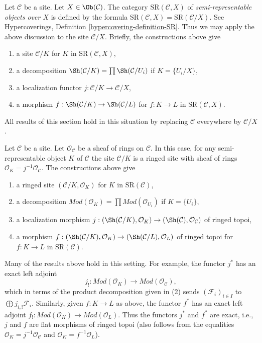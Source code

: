 \begin{remark}
\label{remark-semi-representable-over-object}
Let $\mathcal{C}$ be a site. Let $X \in \Ob(\mathcal{C})$.
The category $\text{SR}(\mathcal{C}, X)$
of {\it semi-representable objects over $X$}
is defined by the formula
$\text{SR}(\mathcal{C}, X) = \text{SR}(\mathcal{C}/X)$.
See Hypercoverings, Definition \ref{hypercovering-definition-SR}.
Thus we may apply the above discussion to the site
$\mathcal{C}/X$. Briefly, the constructions above give
\begin{enumerate}
\item a site $\mathcal{C}/K$ for $K$ in $\text{SR}(\mathcal{C}, X)$,
\item a decomposition
$\Sh(\mathcal{C}/K) = \prod \Sh(\mathcal{C}/U_i)$ if $K = \{U_i/X\}$,
\item a localization functor $j : \mathcal{C}/K \to \mathcal{C}/X$,
\item a morphism $f : \Sh(\mathcal{C}/K) \to \Sh(\mathcal{C}/L)$
for $f : K \to L$ in $\text{SR}(\mathcal{C}, X)$.
\end{enumerate}
All results of this section hold in this situation by replacing
$\mathcal{C}$ everywhere by $\mathcal{C}/X$.
\end{remark}

\begin{remark}
\label{remark-semi-representable-ringed}
Let $\mathcal{C}$ be a site. Let $\mathcal{O}_\mathcal{C}$
be a sheaf of rings on $\mathcal{C}$. In this case, for any
semi-representable object $K$ of $\mathcal{C}$ the site
$\mathcal{C}/K$ is a ringed site with sheaf
of rings $\mathcal{O}_K = j^{-1}\mathcal{O}_\mathcal{C}$.
The constructions above give
\begin{enumerate}
\item a ringed site $(\mathcal{C}/K, \mathcal{O}_K)$
for $K$ in $\text{SR}(\mathcal{C})$,
\item a decomposition
$\textit{Mod}(\mathcal{O}_K) =
\prod \textit{Mod}(\mathcal{O}_{U_i})$ if $K = \{U_i\}$,
\item a localization morphism
$j : (\Sh(\mathcal{C}/K), \mathcal{O}_K) \to
(\Sh(\mathcal{C}), \mathcal{O}_\mathcal{C})$
of ringed topoi,
\item a morphism
$f : (\Sh(\mathcal{C}/K), \mathcal{O}_K) \to
(\Sh(\mathcal{C}/L), \mathcal{O}_L)$ of ringed topoi
for $f : K \to L$ in $\text{SR}(\mathcal{C})$.
\end{enumerate}
Many of the results above hold in this setting. For example, the
functor $j^*$ has an exact left adjoint
$$
j_! : \textit{Mod}(\mathcal{O}_K) \to \textit{Mod}(\mathcal{O}_\mathcal{C}),
$$
which in terms of the product decomposition given in (2) sends
$(\mathcal{F}_i)_{i \in I}$ to $\bigoplus j_{i, !}\mathcal{F}_i$.
Similarly, given $f : K \to L$ as above, the functor $f^*$ has
an exact left adjoint
$f_! : \textit{Mod}(\mathcal{O}_K) \to \textit{Mod}(\mathcal{O}_L)$.
Thus the functors $j^*$ and $f^*$ are exact, i.e.,
$j$ and $f$ are flat morphisms of ringed topoi (also follows
from the equalities $\mathcal{O}_K = j^{-1}\mathcal{O}_\mathcal{C}$
and $\mathcal{O}_K = f^{-1}\mathcal{O}_L$).
\end{remark}

